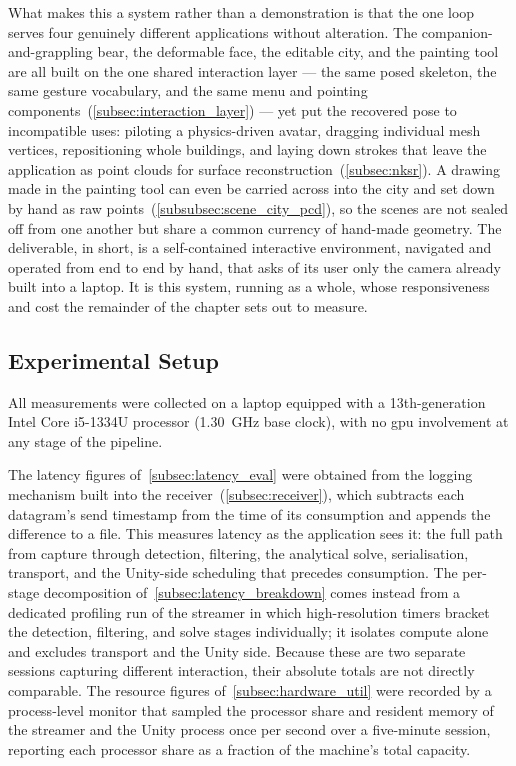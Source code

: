 What makes this a system rather than a demonstration is that the one loop serves
four genuinely different applications without alteration. The companion-and-grappling
bear, the deformable face, the editable city, and the painting tool are all built
on the one shared interaction layer --- the same posed skeleton, the same gesture
vocabulary, and the same menu and pointing components~(\autoref{subsec:interaction_layer})
--- yet put the recovered pose to incompatible uses: piloting a physics-driven
avatar, dragging individual mesh vertices, repositioning whole buildings, and
laying down strokes that leave the application as point clouds for surface
reconstruction~(\autoref{subsec:nksr}). A drawing made in the painting tool can
even be carried across into the city and set down by hand as raw
points~(\autoref{subsubsec:scene_city_pcd}), so the scenes are not sealed off from
one another but share a common currency of hand-made geometry. The deliverable, in
short, is a self-contained interactive environment, navigated and operated from end
to end by hand, that asks of its user only the camera already built into a laptop.
It is this system, running as a whole, whose responsiveness and cost the remainder
of the chapter sets out to measure.



\subsection{Experimental Setup}\label{subsec:eval_setup}

All measurements were collected on a laptop equipped with a 13th-generation
Intel Core i5-1334U processor (\SI{1.30}{\GHz} base clock), with no
\acrshort{gpu} involvement at any stage of the pipeline.

The latency figures of~\autoref{subsec:latency_eval} were obtained from the
logging mechanism built into the receiver~(\autoref{subsec:receiver}), which
subtracts each datagram's send timestamp from the time of its consumption and
appends the difference to a file. This measures latency as the application sees
it: the full path from capture through detection, filtering, the analytical solve,
serialisation, transport, and the Unity-side scheduling that precedes consumption.
The per-stage decomposition of~\autoref{subsec:latency_breakdown} comes instead
from a dedicated profiling run of the streamer in which high-resolution timers
bracket the detection, filtering, and solve stages individually; it isolates
compute alone and excludes transport and the Unity side. Because these are two
separate sessions capturing different interaction, their absolute totals are not
directly comparable.
The resource figures of~\autoref{subsec:hardware_util} were recorded by a
process-level monitor that sampled the processor share and resident memory of the
streamer and the Unity process once per second over a five-minute session,
reporting each processor share as a fraction of the machine's total capacity.



